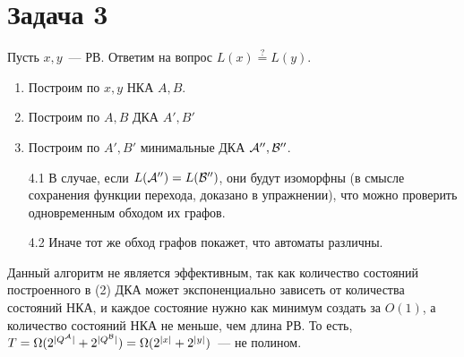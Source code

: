 \documentclass[a4paper]{article}
\def\A{{\cal A}}
\def\B{{\cal B}}
\begin{document}
\section*{Задача 3}
Пусть $x,y$~--- РВ. Ответим на вопрос $L(x)\overset{?}{=}L(y)$.
\begin{enumerate}
\item Построим по $x,y$ НКА $A,B$.
\item Построим по $A,B$ ДКА $A',B'$
\item Построим по $A',B'$ минимальные ДКА $\A'',\B''$. 
\item [4.1] В случае, если $L(\A'')=L(\B'')$, они будут изоморфны (в смысле сохранения функции перехода, доказано в упражнении), что можно проверить одновременным обходом их графов.
\item [4.2] Иначе тот же обход графов покажет, что автоматы различны.
\end{enumerate}
Данный алгоритм не является эффективным, так как количество состояний построенного в (2) ДКА может экспоненциально зависеть от количества состояний НКА, и каждое состояние нужно как минимум создать за $O(1)$, а количество состояний НКА не меньше, чем длина РВ. То есть, $T=\Omega(2^{|Q^\A|}+2^{|Q^\B|})=\Omega(2^{|x|}+2^{|y|})$~--- не полином.
\newpage
\end{document}

